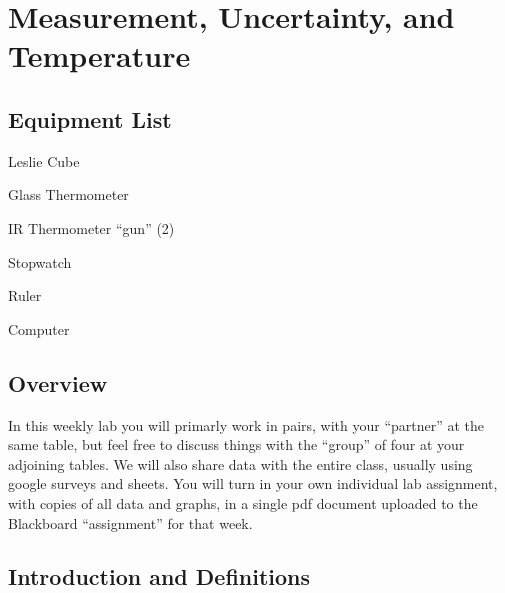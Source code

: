 
\chapter{Measurement, Uncertainty, and Temperature}

\section*{Equipment List}

\begin{multicols}{2}   %
\begin{equipment}
  \item Leslie Cube
  \item Glass Thermometer
  \item IR Thermometer ``gun'' (2)
  \item Stopwatch
  \item Ruler
  \item Computer
\end{equipment}
\end{multicols}

\section*{Overview}

In this weekly lab you will primarly work in pairs, with your ``partner'' at the same table, but feel free to discuss things with the ``group'' of four at your adjoining tables.  We will also share data with the entire class, usually using google surveys and sheets.  You will turn in your own individual lab assignment, with copies of all data and graphs, in a single pdf document uploaded to the Blackboard ``assignment'' for that week.

\section{Introduction and Definitions}

